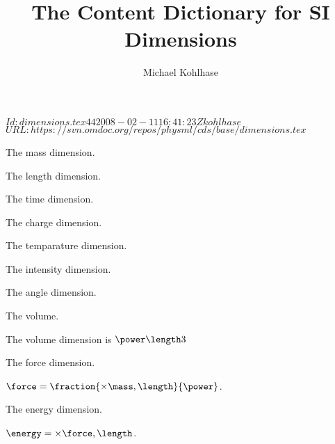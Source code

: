 \documentclass[twoside]{article}
\title{The Content Dictionary for SI Dimensions}
\author{Michael Kohlhase}
\begin{document}
\svnInfo $Id: dimensions.tex 44 2008-02-11 16:41:23Z kohlhase $
\svnKeyword $URL: https://svn.omdoc.org/repos/physml/cds/base/dimensions.tex $
\maketitle

\begin{module}[id=dimensions]

\begin{consymb}[name=mass]
  The mass dimension.
\end{consymb}

\begin{consymb}[name=length]
  The length dimension.
\end{consymb}

\begin{consymb}[name=time]
  The time dimension.
\end{consymb}

\begin{consymb}[name=charge]
  The charge dimension.
\end{consymb} 

\begin{consymb}[name=temperature]
  The temparature dimension.
\end{consymb} 

\begin{consymb}[name=intensity]
  The intensity dimension.
\end{consymb}

\begin{consymb}[name=angle]
  The angle dimension.
\end{consymb}

\begin{consymb}[name=volume]
  The volume.
\end{consymb}
\begin{definition}[for=volume,type=simple]
  The volume dimension is $\power\length3$
\end{definition}

\begin{consymb}[name=force]
  The force dimension.
\end{consymb}
\begin{definition}[for=force,type=implicit]
  $\force=\fraction{\times{\mass,\length}}{\power\time2}$.
\end{definition}

\begin{consymb}[name=energy]
  The energy dimension.
\end{consymb}
\begin{definition}[for=energy,type=implicit]
  $\energy=\times{\force,\length}$.
\end{definition}

\end{module}
\end{document}
